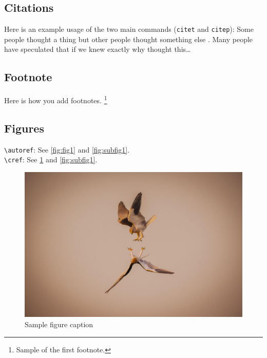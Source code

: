 \documentclass[onecolumn]{article}
\theoremstyle{definition}
\theoremstyle{remark}
\begin{document}
\subsection{Citations}

Here is an example usage of the two main commands (\verb+citet+ and \verb+citep+): Some people thought a thing \citep{kour2014real, hadash2018estimate} but other people thought something else \citep{kour2014fast}. Many people have speculated that if we knew exactly why \citet{kour2014fast} thought this\dots

\subsection{Footnote}

Here is how you add footnotes. \footnote{Sample of the first footnote.}

\subsection{Figures}

\verb+\autoref+: See \autoref{fig:fig1} and \autoref{fig:subfig1}. \\
\verb+\cref+: See \cref{fig:fig1} and \cref{fig:subfig1}. 


\begin{figure}[ht]
    \centering
    \includegraphics[width=.3\linewidth]{fig/example1.jpg}
    \caption{Sample figure caption}
    \label{fig:fig1}
\end{figure}
\end{document}

